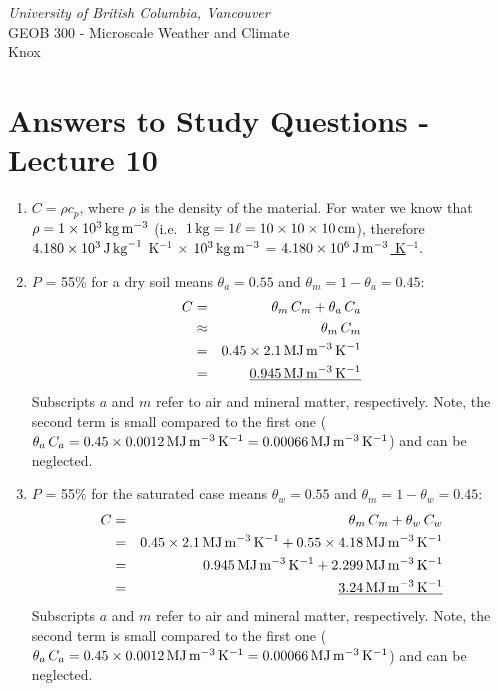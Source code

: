 \documentclass[11pt]{article}
\author{Andy Black and Andreas Christen}
\begin{document}
\begin{center}
\emph{University of British Columbia, Vancouver}\\
GEOB 300 - Microscale Weather and Climate\\
Knox
\section*{Answers to Study Questions - Lecture 10}
\end{center}

\begin{enumerate}

\item $C = \rho c_p$, where $\rho$ is the density of the material. For water we know that $\rho = 1 \times 10^3\, \rm{kg}\, \rm{m}^{-3}$ (i.e.\ $1\,\rm{kg} = 1 \ell = 10 \times 10 \times 10\, \rm{cm}$), therefore $4.180 \times 10^{3}\, \rm{J}\, \rm{kg}^{-1}$ K$^{-1}$ $\times$ $10^3\, \rm{kg} \, \rm{m}^{-3}$ = \underline{$4.180 \times 10^{6}\, \rm{J}\, \rm{m}^{-3}$ K$^{-1}$}.

\item $P$ = 55\% for a dry soil means $\theta_a = 0.55$ and $\theta_{m} = 1 - \theta_a = 0.45$:
\begin{eqnarray*} 
C &=& \theta_m\,C_m + \theta_a\,C_a \\
 &\approx& \theta_m\,C_m \\
 &=& 0.45 \times 2.1 \,\rm{MJ}\,\rm{m}^{-3}\,\rm{K}^{-1} \\
 &=& \underline{0.945\,\rm{MJ}\,\rm{m}^{-3}\,\rm{K}^{-1}}
\end{eqnarray*} 
Subscripts $a$ and $m$ refer to air and mineral matter, respectively. Note, the second term is small compared to the first one ($\theta_a\,C_a = 0.45 \times 0.0012 \,\rm{MJ}\,\rm{m}^{-3}\,\rm{K}^{-1} = 0.00066 \,\rm{MJ}\,\rm{m}^{-3}\,\rm{K}^{-1}$) and can be neglected.

\item $P$ = 55\% for the saturated case means $\theta_w = 0.55$ and $\theta_{m} = 1 - \theta_w = 0.45$:
\begin{eqnarray*} 
C &=& \theta_m\,C_m + \theta_w\,C_w \\
 &=& 0.45 \times 2.1 \,\rm{MJ}\,\rm{m}^{-3}\,\rm{K}^{-1} + 0.55 \times 4.18 \,\rm{MJ}\,\rm{m}^{-3}\,\rm{K}^{-1}  \\
 &=& 0.945\,\rm{MJ}\,\rm{m}^{-3}\,\rm{K}^{-1} + 2.299\,\rm{MJ}\,\rm{m}^{-3}\,\rm{K}^{-1} \\
 &=& \underline{3.24\,\rm{MJ}\,\rm{m}^{-3}\,\rm{K}^{-1}}
\end{eqnarray*} 
Subscripts $a$ and $m$ refer to air and mineral matter, respectively. Note, the second term is small compared to the first one ($\theta_a\,C_a = 0.45 \times 0.0012 \,\rm{MJ}\,\rm{m}^{-3}\,\rm{K}^{-1} = 0.00066 \,\rm{MJ}\,\rm{m}^{-3}\,\rm{K}^{-1}$) and can be neglected.


\end{enumerate}
\end{document}
